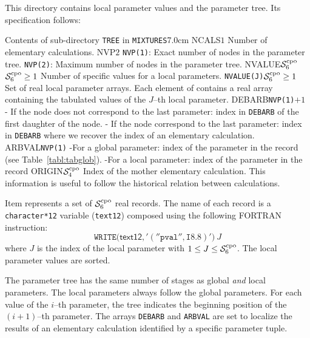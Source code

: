 This directory contains local parameter values and the parameter tree. Its specification follows:

\begin{DescriptionEnregistrement}{Contents of sub-directory {\tt TREE} in
{\tt MIXTURES}}{7.0cm}
\label{tabl:tabctree}
\IntEnr
  {NCALS}{$1$}
  {Number of elementary calculations.}
\IntEnr
  {NVP}{$2$}
  {{\tt NVP(1)}: Exact number of nodes in the parameter tree. {\tt NVP(2)}: Maximum number of nodes in the parameter tree.}
\OptIntEnr
  {NVALUE}{$\mathcal{S}^{\rm cpo}_{6}$}{$\mathcal{S}^{\rm cpo}_{6}\ge 1$}
  {Number of specific values for a local parameters.}
\OptRealVar
  {}{\tt NVALUE(J)}{$\mathcal{S}^{\rm cpo}_{6}\ge 1$}{}
  {Set of real local parameter arrays. Each element of  contains a
   real array containing the tabulated values of the $J$--th local parameter.}
\IntEnr
  {DEBARB}{{\tt NVP(1)}$+1$}
  {- If the node does not correspond to the last parameter:
     index in {\tt DEBARB} of the first daughter of the node.
   - If the node correspond to the last parameter: index in
     {\tt DEBARB} where we recover the index of an elementary
     calculation.}
\IntEnr
  {ARBVAL}{{\tt NVP(1)}}
  {-For a global parameter: index of the parameter in the 
   record (see Table~\ref{tabl:tabglob}).
   -For a local parameter: index of the parameter in the  record}
\IntEnr
  {ORIGIN}{$\mathcal{S}^{\rm cpo}_{4}$}
  {Index of the mother elementary calculation. This information is useful to follow the
  historical relation between calculations.}
\end{DescriptionEnregistrement}

Item  represents a set of $\mathcal{S}^{\rm cpo}_{6}$ real records. The name of each
 record is a {\tt character*12} variable ({\tt text12})
composed using the following FORTRAN instruction:
$$
\mathtt{WRITE(}\mathsf{text12}\mathtt{,'(''pval'',I8.8)')}\: J
$$
where $J$ is the index of the local parameter with $1 \leq J \leq \mathcal{S}^{\rm cpo}_{6}$. The local
parameter values are sorted.

\vskip 0.2cm

The parameter tree has the same number of stages as global {\sl and} local parameters. The local parameters
always follow the global parameters. For each value of
the $i$--th parameter, the tree indicates the beginning position of the $(i+1)$--th parameter.
The arrays {\tt DEBARB} and {\tt ARBVAL} are set to localize the results of an elementary calculation
identified by a specific parameter tuple.

